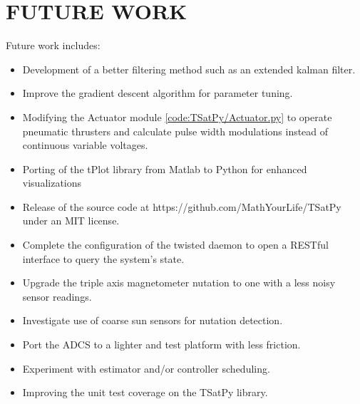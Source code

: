 \chapter{FUTURE WORK}
\label{chap:FutureWork}


Future work includes:

\begin{itemize}
\item Development of a better filtering method such as an extended kalman filter.
\item Improve the gradient descent algorithm for parameter tuning.
\item Modifying the Actuator module \ref{code:TSatPy/Actuator.py} to operate pneumatic thrusters and calculate pulse width modulations instead of continuous variable voltages.
\item Porting of the tPlot library from Matlab to Python for enhanced visualizations
\item Release of the source code at https://github.com/MathYourLife/TSatPy under an MIT license.
\item Complete the configuration of the twisted daemon to open a RESTful interface to query the system's state.
\item Upgrade the triple axis magnetometer nutation to one with a less noisy sensor readings.
\item Investigate use of coarse sun sensors for nutation detection.
\item Port the ADCS to a lighter and test platform with less friction.
\item Experiment with estimator and/or controller scheduling.
\item Improving the unit test coverage on the TSatPy library.
\end{itemize}

